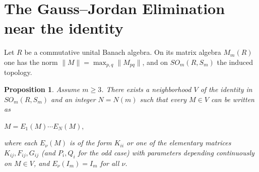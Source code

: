 \documentclass[11pt]{amsart}
\newtheorem{proposition}[theorem]{Proposition}
\theoremstyle{definition}
\theoremstyle{remark}
\theoremstyle{remark}
\begin{document}
\section{The Gauss--Jordan Elimination near the identity} \label{sec-GJ}
Let $R$ be a commutative unital Banach algebra. On its matrix algebra $M_m(R)$ one has the norm
$\|M\|=\max_{p,q}\|M_{pq}\|$, and on $SO_m(R, S_m)$ the induced topology. 
\begin{proposition}%
\label{lemm-GJ-orth}
Assume $m\geq 3$. There exists a neighborhood $V$ of the identity in $SO_{m}(R,S_m)$ and an integer $N=N(m)$ such that
every $M\in V$ can be written as
\begin{center}
$M = E_1(M)\cdots E_N(M),$
\end{center}
where each $E_\nu(M)$ is of the form $K_{ii}$ or one of the elementary matrices
$K_{ij},F_{ij},G_{ij}$ (and $P_i, Q_i$ for the odd case) with parameters depending continuously on $M\in V$,
and $E_\nu(I_m)=I_m$ for all $\nu$.
\end{proposition}
\end{document}
